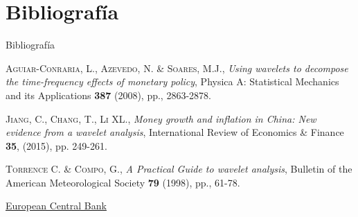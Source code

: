 \documentclass[11pt]{beamer}
\begin{document}
    \section{Bibliografía}
    \begin{frame}{Bibliografía}
        \begin{thebibliography}{99}


    \textsc{Aguiar-Conraria, L., Azevedo, N. \& Soares, M.J.}, \textit{Using wavelets to decompose the time-frequency effects of monetary policy}, Physica A: Statistical Mechanics and its Applications {\bf 387}  (2008), pp., 2863-2878.  
    
    \textsc{Jiang, C., Chang, T., Li XL.}, \textit{Money growth and inflation in China: New evidence from a wavelet analysis}, International Review of Economics \& Finance {\bf 35}, (2015), pp. 249-261. 

    \textsc{Torrence C. \& Compo, G.}, \textit{A Practical Guide to wavelet analysis}, Bulletin of the American Meteorological Society {\bf 79}  (1998), pp., 61-78.  

    \href{https://data.ecb.europa.eu/data}{European Central Bank}

\end{thebibliography}
    \end{frame}
	
\end{document}
